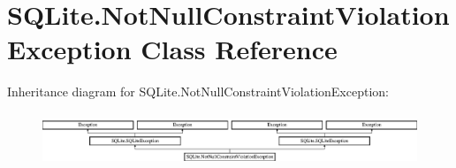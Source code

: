 \hypertarget{classSQLite_1_1NotNullConstraintViolationException}{\section{S\-Q\-Lite.\-Not\-Null\-Constraint\-Violation\-Exception Class Reference}
\label{classSQLite_1_1NotNullConstraintViolationException}
}
Inheritance diagram for S\-Q\-Lite.\-Not\-Null\-Constraint\-Violation\-Exception\-:\begin{figure}[H]
\begin{center}
\leavevmode
\includegraphics[height=1.590909cm]{classSQLite_1_1NotNullConstraintViolationException}
\end{center}
\end{figure}

